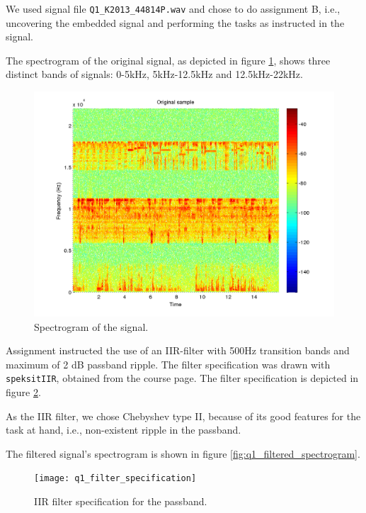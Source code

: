 We used signal file {\tt Q1\_K2013\_44814P.wav} and chose to do
assignment B, i.e., uncovering the embedded signal and performing the
tasks as instructed in the signal. 

The spectrogram of the original signal, as depicted in
figure \ref{fig:q1_spectrogram}, shows three distinct bands of signals:
0-5kHz, 5kHz-12.5kHz and 12.5kHz-22kHz.

\begin{figure}
  \begin{center}
    \hspace*{-1in}
    \includegraphics[width=180mm]{q1_spectrogram}
    \caption{Spectrogram of the signal. \label{fig:q1_spectrogram}}
  \end{center}  
\end{figure}

Assignment instructed the use of an IIR-filter with 500Hz transition
bands and maximum of 2 dB passband ripple.  The filter specification was
drawn with {\tt speksitIIR}, obtained from the course page.  The filter
specification is depicted in figure \ref{fig:q1_filter_specification}.

As the IIR filter, we chose Chebyshev type II, because of its good
features for the task at hand, i.e., non-existent ripple in the
passband.

The filtered signal's spectrogram is shown in figure
\ref{fig:q1_filtered_spectrogram}.

\begin{figure}
  \begin{center}
    \hspace*{-1in}
    \texttt{[image: q1\_filter\_specification]}
    \caption{IIR filter specification for the
      passband. \label{fig:q1_filter_specification}}
  \end{center}  
\end{figure}

